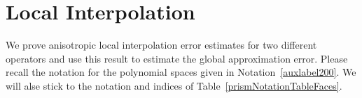 \chapter{Local Interpolation}
We prove anisotropic local interpolation error estimates for two different operators
and use this result to estimate the global approximation error. Please recall 
the notation for the polynomial spaces given in Notation~\ref{auxlabel200}. We 
will alse stick to the notation and indices of Table~\ref{prismNotationTableFaces}.





